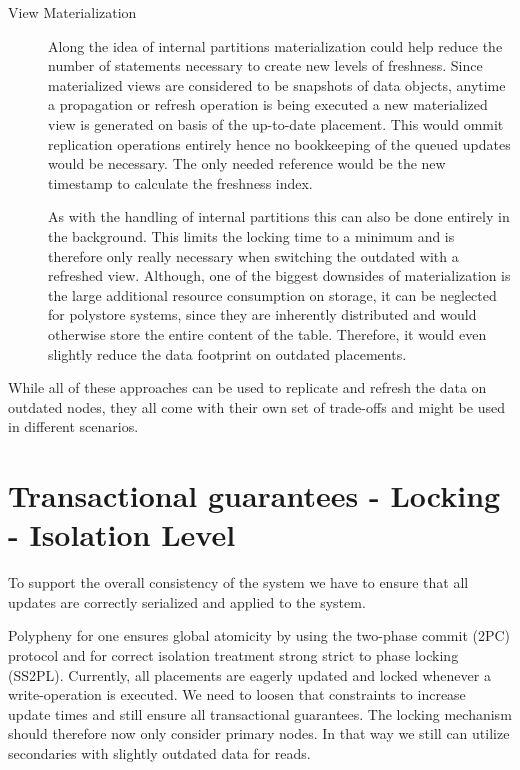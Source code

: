 \begin{description}



    \item [View Materialization]
    Along the idea of internal partitions materialization could help reduce the number of statements necessary to create new levels of freshness.
    Since materialized views are considered to be snapshots of data objects, anytime a propagation or refresh operation is being executed a new materialized view is 
    generated on basis of the up-to-date placement.
    This would ommit replication operations entirely hence no bookkeeping of the queued updates would be necessary. The only needed reference would be the new timestamp
    to calculate the freshness index.

    As with the handling of internal partitions this can also be done entirely in the background. This limits the locking time to a minimum and is therefore only really 
    necessary when switching the outdated with a refreshed view.
    Although, one of the biggest downsides of materialization is the large additional resource consumption on storage, it can be neglected for polystore systems, since they are
    inherently distributed and would otherwise store the entire content of the table. Therefore, it would even slightly reduce the data footprint on outdated placements.

\end{description}


While all of these approaches can be used to replicate and refresh the data on outdated nodes, they all come with their own set of trade-offs and might be used in different scenarios. 






\section{Transactional guarantees - Locking - Isolation Level}
\label{consistency}

To support the overall consistency of the system we have to ensure that all updates are correctly serialized and applied to the system.

Polypheny for one ensures global atomicity by using the two-phase commit (2PC) protocol and for correct isolation treatment
strong strict to phase locking (SS2PL). Currently, all placements are eagerly updated and locked whenever a write-operation is executed.
We need to loosen that constraints to increase update times and still ensure all transactional guarantees. The locking mechanism should therefore 
now only consider primary nodes. In that way we still can utilize secondaries with slightly outdated data for reads.\\

